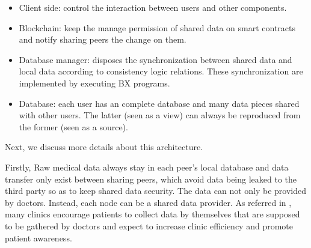 \documentclass[conference]{IEEEtran}
\begin{document}
\begin{itemize}
	\item Client side: control the interaction between users and other components.
	
	\item Blockchain: keep the manage permission of shared data on smart contracts and notify sharing peers the change on them.
	 
	\item Database manager: disposes the synchronization between shared data and local data according to consistency logic relations. These synchronization are implemented by executing BX programs.
	
	\item Database: each user has an complete database and many data pieces shared with other users. The latter (seen as a view) can always be reproduced from the former (seen as a source).
	
\end{itemize}

Next, we discuss more details about this architecture.




Firstly, Raw medical data always stay in each peer's local database and data transfer only exist between sharing peers, which avoid data being leaked to the third party so as to keep shared data security. The data can not only be provided by doctors. Instead, each node can be a shared data provider. As referred in \cite{chung2018using},  many clinics encourage patients to collect data by themselves that are supposed to be gathered by doctors and expect to increase clinic efficiency and promote patient awareness. 
\end{document}
